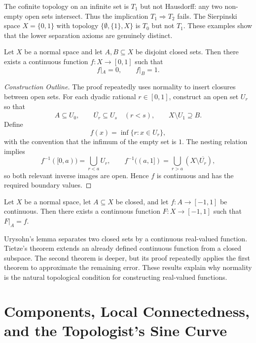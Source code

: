 \begin{example}
The cofinite topology on an infinite set is $T_1$ but not Hausdorff: any two non-empty open sets intersect. Thus the implication $T_1\Rightarrow T_2$ fails. The Sierpinski space $X=\{0,1\}$ with topology $\{\emptyset,\{1\},X\}$ is $T_0$ but not $T_1$. These examples show that the lower separation axioms are genuinely distinct.
\end{example}

\begin{theorem}
Let $X$ be a normal space and let $A,B\subseteq X$ be disjoint closed sets. Then there exists a continuous function $f:X\to[0,1]$ such that
\[
    f|_A=0,\qquad f|_B=1.
\]
\end{theorem}

\begin{proof}[Construction Outline]
The proof repeatedly uses normality to insert closures between open sets. For each dyadic rational $r\in[0,1]$, construct an open set $U_r$ so that
\[
    A\subseteq U_0,
    \qquad \overline{U_r}\subseteq U_s\quad(r<s),
    \qquad X\setminus U_1\supseteq B.
\]
Define
\[
    f(x)=\inf\{r:x\in U_r\},
\]
with the convention that the infimum of the empty set is $1$. The nesting relation implies
\[
    f^{-1}([0,a))=\bigcup_{r<a}U_r,
    \qquad
    f^{-1}((a,1])=\bigcup_{r>a}(X\setminus\overline{U_r}),
\]
so both relevant inverse images are open. Hence $f$ is continuous and has the required boundary values.
\end{proof}

\begin{theorem}
Let $X$ be a normal space, let $A\subseteq X$ be closed, and let $f:A\to[-1,1]$ be continuous. Then there exists a continuous function $F:X\to[-1,1]$ such that $F|_A=f$.
\end{theorem}

\begin{remark}
Urysohn's lemma separates two closed sets by a continuous real-valued function. Tietze's theorem extends an already defined continuous function from a closed subspace. The second theorem is deeper, but its proof repeatedly applies the first theorem to approximate the remaining error. These results explain why normality is the natural topological condition for constructing real-valued functions.
\end{remark}

\section{Components, Local Connectedness, and the Topologist's Sine Curve}

